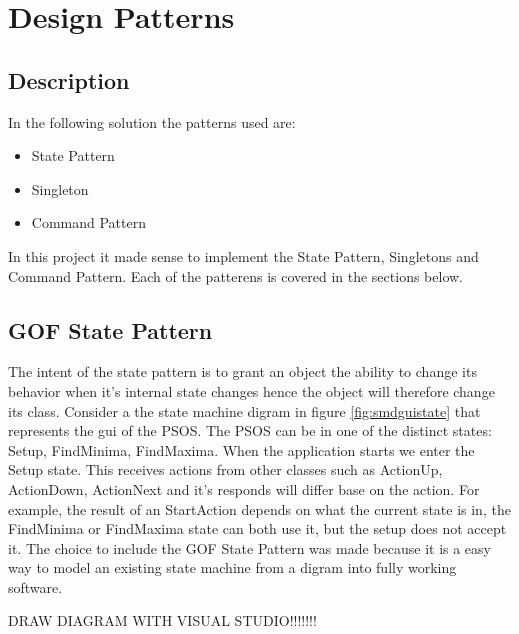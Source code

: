\section{Design Patterns} \label{designpatterns}

\subsection{Description}

\noindent{}

In the following solution the patterns   used are:
\begin{itemize}
	\item State Pattern
	\item Singleton
	\item Command Pattern
\end{itemize}

In this project it made sense to implement the State Pattern, Singletons and Command Pattern. Each of the patterens is covered in the sections below.

\subsection{GOF State Pattern}
The intent of the state pattern is to grant an object the ability to change its behavior when it's internal state changes hence the object will therefore change its class. Consider a the state machine digram in figure \ref{fig:smdguistate} that represents the gui of the PSOS. The PSOS can be in one of the distinct states: Setup, FindMinima, FindMaxima. When the application starts we enter the Setup state. This receives actions from other classes such as ActionUp, ActionDown, ActionNext and it's responds will differ base on the action. For example, the result of an StartAction depends on what the current state is in, the FindMinima or FindMaxima state can both use it, but the setup does not accept it. The choice to include the GOF State Pattern was made because it is a easy way to model an existing state machine from a digram into fully working software. 

DRAW DIAGRAM WITH VISUAL STUDIO!!!!!!!

